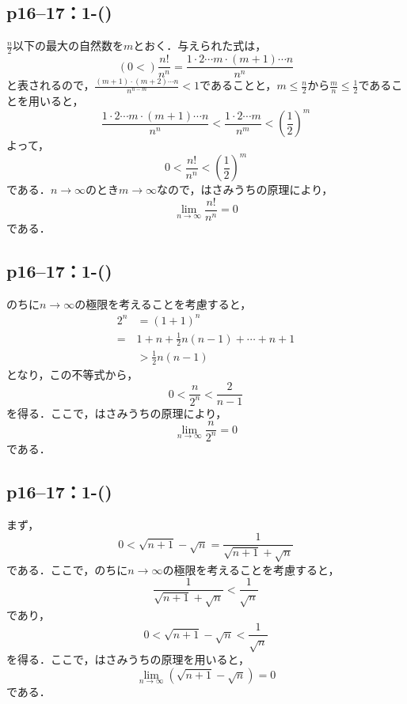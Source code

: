 \subsection*{p16--17：1-()}

\begin{tanswer}
    $\frac{n}{2}$以下の最大の自然数を$m$とおく．与えられた式は，
    \[
        \left( 0  < \right) \frac{n!}{n^n}  = \frac{1 \cdot 2 \dotsm m \cdot (m+1) \dotsm n}{n^n}
    \]
    と表されるので，$\frac{(m+1) \cdot (m+2) \dotsm n}{n^{n-m}} <1$であることと，$m \le \frac{n}{2}$から$\frac{m}{n} \le \frac{1}{2}$であることを用いると，
    \[
        \frac{1 \cdot 2 \dotsm m \cdot (m+1) \dotsm n}{n^n} < \frac{1 \cdot 2 \dotsm m}{n^m} <\left(\frac{1}{2}\right)^m
    \]
    よって，
    \[
        0 < \frac{n!}{n^n} <\left(\frac{1}{2}\right)^m
    \]
    である．$n \to \infty$のとき$m \to \infty$なので，はさみうちの原理により，
    \[
        \lim_{n \to \infty}\frac{n!}{n^n} =0
    \]
    である．
\end{tanswer}
\subsection*{p16--17：1-()}
\begin{tanswer}
    のちに$n \to \infty$の極限を考えることを考慮すると，
    \begin{align*}
        2^n & = (1+1)^n                            \\
        =   & 1+n +\frac{1}{2} n(n-1)+ \cdots +n+1 \\
            & > \frac{1}{2} n(n-1)
    \end{align*}
    となり，この不等式から，
    \[
        0< \frac{n}{2^n} < \frac{2}{n-1}
    \]
    を得る．ここで，はさみうちの原理により，
    \[
        \lim_{n \to \infty} \frac{n}{2^n}=0
    \]
    である．
\end{tanswer}

\subsection*{p16--17：1-()}
\begin{tanswer}
    まず，
    \[
        0<\sqrt{n+1} - \sqrt{n} = \frac{1}{\sqrt{n+1} + \sqrt{n}}
    \]
    である．ここで，のちに$n \to \infty$の極限を考えることを考慮すると，
    \[
        \frac{1}{\sqrt{n+1} + \sqrt{n}} < \frac{1}{\sqrt{n}}
    \]
    であり，
    \[
        0< \sqrt{n+1} - \sqrt{n} <\frac{1}{\sqrt{n}}
    \]
    を得る．ここで，はさみうちの原理を用いると，
    \[
        \lim_{n \to \infty} (\sqrt{n+1} - \sqrt{n} )=0
    \]
    である．
\end{tanswer}

